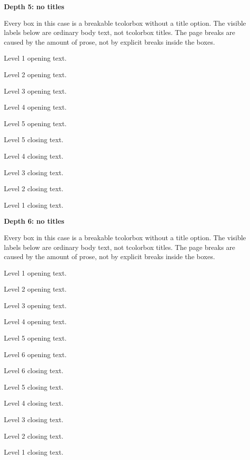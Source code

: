 \documentclass[a4paper,10pt]{article}
\newcommand{\caselead}[1]{%
  \clearpage
  {\Large\bfseries #1\par}
  \medskip
  Every box in this case is a breakable tcolorbox without a title option.
  The visible labels below are ordinary body text, not tcolorbox titles.
  The page breaks are caused by the amount of prose, not by explicit breaks
  inside the boxes.
  \medskip
}
\newcommand{\innertext}{%
  \lipsum[1-5]
  \medskip
  \lipsum[6-9]
}
\begin{document}
\caselead{Depth 5: no titles}
\begin{depthone}
Level 1 opening text.

\begin{depthtwo}
Level 2 opening text.

\begin{depththree}
Level 3 opening text.

\begin{depthfour}
Level 4 opening text.

\begin{depthfive}
Level 5 opening text.

\innertext

Level 5 closing text.
\end{depthfive}

Level 4 closing text.
\end{depthfour}

Level 3 closing text.
\end{depththree}

Level 2 closing text.
\end{depthtwo}

Level 1 closing text.
\end{depthone}

\caselead{Depth 6: no titles}
\begin{depthone}
Level 1 opening text.

\begin{depthtwo}
Level 2 opening text.

\begin{depththree}
Level 3 opening text.

\begin{depthfour}
Level 4 opening text.

\begin{depthfive}
Level 5 opening text.

\begin{depthsix}
Level 6 opening text.

\innertext

Level 6 closing text.
\end{depthsix}

Level 5 closing text.
\end{depthfive}

Level 4 closing text.
\end{depthfour}

Level 3 closing text.
\end{depththree}

Level 2 closing text.
\end{depthtwo}

Level 1 closing text.
\end{depthone}
\end{document}
